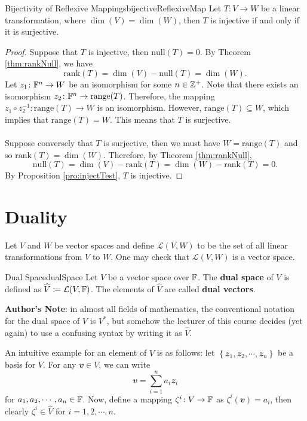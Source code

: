 \documentclass[math, code]{amznotes}
\theoremstyle{remark}
\begin{document}
\begin{corbox}{Bijectivity of Reflexive Mappings}{bijectiveReflexiveMap}
    Let $T \colon V \to W$ be a linear transformation, where $\dim(V) = \dim(W)$, then $T$ is injective if and only if it is surjective.
    \tcblower
    \begin{proof}
        Suppose that $T$ is injective, then $\mathrm{null}(T) = 0$. By Theorem \ref{thm:rankNull}, we have 
        \begin{equation*}
            \mathrm{rank}(T) = \dim(V) - \mathrm{null}(T) = \dim(W).
        \end{equation*} 
        Let $z_1 \colon \mathbb{F}^n \to W$ be an isomorphism for some $n \in \mathbb{Z}^+$. Note that there exists an isomorphism $z_2 \colon \mathbb{F}^n \to \mathrm{range}(T)$. Therefore, the mapping $z_1 \circ z_2^{-1} \colon \mathrm{range}(T) \to W$ is an isomorphism. However, $\mathrm{range}(T) \subseteq W$, which implies that $\mathrm{range}(T) = W$. This means that $T$ is surjective.
        \\\\
        Suppose conversely that $T$ is surjective, then we must have $W = \mathrm{range}(T)$ and so $\mathrm{rank}(T) = \dim(W)$. Therefore, by Theorem \ref{thm:rankNull}, 
        \begin{equation*}
            \mathrm{null}(T) = \dim(V) - \mathrm{rank}(T) = \dim(W) - \mathrm{rank}(T) = 0.
        \end{equation*}
        By Proposition \ref{pro:injectTest}, $T$ is injective.
    \end{proof}
\end{corbox}
\section{Duality}
Let $V$ and $W$ be vector spaces and define $\mathcal{L}(V, W)$ to be the set of all linear transformations from $V$ to $W$. One may check that $\mathcal{L}(V, W)$ is a vector space.
\begin{dfnbox}{Dual Space}{dualSpace}
    Let $V$ be a vector space over $\mathbb{F}$. The {\color{red} \textbf{dual space}} of $V$ is defined as $\widehat{V} \coloneqq \mathcal{L}(V, \mathbb{F})$. The elements of $\widehat{V}$ are called {\color{red} \textbf{dual vectors}}.
\end{dfnbox}
\begin{notebox}
    \textbf{Author's Note}: in almost all fields of mathematics, the conventional notation for the dual space of $V$ is $V^*$, but somehow the lecturer of this course decides (yet again) to use a confusing syntax by writing it as $\widehat{V}$.
\end{notebox}
An intuitive example for an element of $\widehat{V}$ is as follows: let $\left\{\mathbfit{z}_1, \mathbfit{z}_2, \cdots, \mathbfit{z}_n\right\}$ be a basis for $V$. For any $\mathbfit{v} \in V$, we can write
\begin{equation*}
    \mathbfit{v} = \sum_{i = 1}^{n}a_i\mathbfit{z}_i
\end{equation*}
for $a_1, a_2, \cdots, a_n \in \mathbb{F}$. Now, define a mapping $\zeta^i \colon V \to \mathbb{F}$ as $\zeta^i(\mathbfit{v}) = a_i$, then clearly $\zeta^i \in \widehat{V}$ for $i = 1, 2, \cdots, n$.
\end{document}

